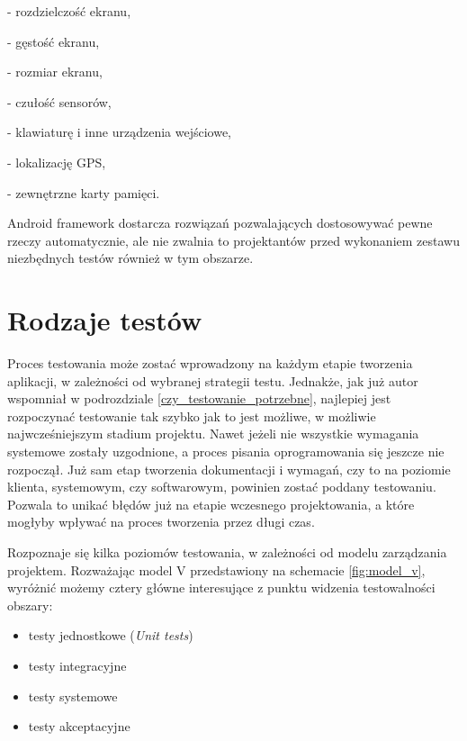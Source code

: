 \begin{itemize}
- rozdzielczość ekranu,

- gęstość ekranu,

- rozmiar ekranu,

- czułość sensorów,

- klawiaturę i inne urządzenia wejściowe,

- lokalizację GPS,

- zewnętrzne karty pamięci.

Android framework dostarcza rozwiązań pozwalających dostosowywać pewne rzeczy automatycznie, ale nie zwalnia to projektantów przed wykonaniem zestawu niezbędnych testów również w tym obszarze.

\end{itemize}

\section{Rodzaje testów}
Proces testowania może zostać wprowadzony na każdym etapie tworzenia aplikacji, w zależności od wybranej strategii testu. Jednakże, jak już autor wspomniał w podrozdziale \ref{czy_testowanie_potrzebne}, najlepiej jest rozpoczynać testowanie tak szybko jak to jest możliwe, w możliwie najwcześniejszym stadium projektu. Nawet jeżeli nie wszystkie wymagania systemowe zostały uzgodnione, a proces pisania oprogramowania się jeszcze nie rozpoczął. Już sam etap tworzenia dokumentacji i wymagań, czy to na poziomie klienta, systemowym, czy softwarowym, powinien zostać poddany testowaniu. Pozwala to unikać błędów już na etapie wczesnego projektowania, a które mogłyby wpływać na proces tworzenia przez długi czas.

Rozpoznaje się kilka poziomów testowania, w zależności od modelu zarządzania projektem. Rozważając model V przedstawiony na schemacie \ref{fig:model_v}, wyróżnić możemy cztery główne interesujące z punktu widzenia testowalności obszary:

\begin{itemize}
\item
testy jednostkowe (\textit{Unit tests})
\item
testy integracyjne
\item
testy systemowe
\item
testy akceptacyjne

\end{itemize}

